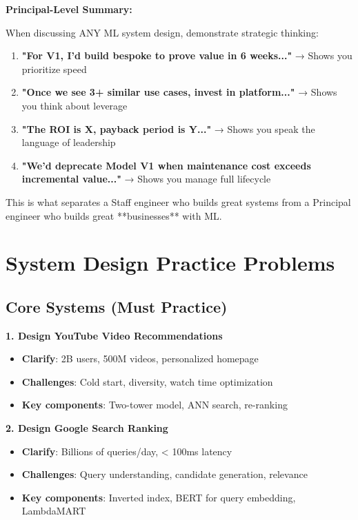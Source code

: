 \documentclass[10pt]{article}
\begin{document}
\textbf{Principal-Level Summary:}

When discussing ANY ML system design, demonstrate strategic thinking:
\begin{enumerate}
\item \textbf{"For V1, I'd build bespoke to prove value in 6 weeks..."} → Shows you prioritize speed
\item \textbf{"Once we see 3+ similar use cases, invest in platform..."} → Shows you think about leverage
\item \textbf{"The ROI is X, payback period is Y..."} → Shows you speak the language of leadership
\item \textbf{"We'd deprecate Model V1 when maintenance cost exceeds incremental value..."} → Shows you manage full lifecycle
\end{enumerate}

This is what separates a Staff engineer who builds great systems from a Principal engineer who builds great **businesses** with ML.

\section{System Design Practice Problems}

\subsection{Core Systems (Must Practice)}

\textbf{1. Design YouTube Video Recommendations}
\begin{itemize}
\item \textbf{Clarify}: 2B users, 500M videos, personalized homepage
\item \textbf{Challenges}: Cold start, diversity, watch time optimization
\item \textbf{Key components}: Two-tower model, ANN search, re-ranking
\end{itemize}

\textbf{2. Design Google Search Ranking}
\begin{itemize}
\item \textbf{Clarify}: Billions of queries/day, < 100ms latency
\item \textbf{Challenges}: Query understanding, candidate generation, relevance
\item \textbf{Key components}: Inverted index, BERT for query embedding, LambdaMART
\end{itemize}
\end{document}
